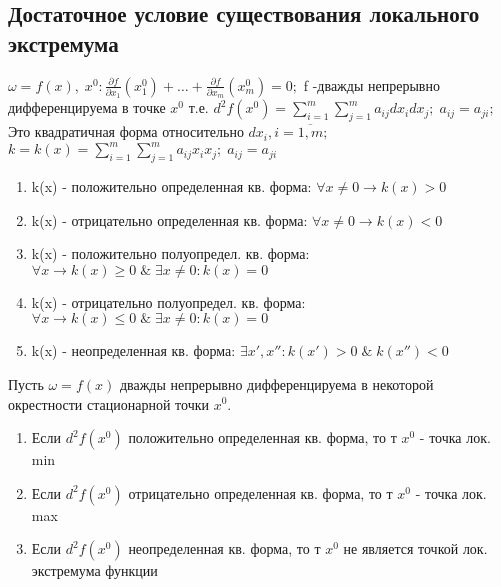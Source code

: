 \documentclass{letnab}
\newcommand{\p}{\partial}
\begin{document}
\subsection{Достаточное условие существования локального экстремума}
$\omega=f(x), \; x^0: \frac{\p f}{\p x_1}(x^0_1) + \dots +  \frac{\p f}{\p x_m}(x^0_m)=0; $ f -дважды непрерывно дифференцируема в точке $x^0$ т.е. $d^2f(x^0)=\sum\limits_{i=1}^{m}\sum\limits_{j=1}^{m}a_{ij}dx_idx_j; \; a_{ij}=a_{ji};$\\
Это квадратичная форма относительно $dx_i, i=\overline{1,m}; \;$ 
$k=k(x)=\sum\limits_{i=1}^{m}\sum\limits_{j=1}^{m}a_{ij}x_ix_j; \; a_{ij}=a_{ji}$
\begin{enumerate}
	\item k(x) - положительно определенная кв. форма: $\forall x\ne 0 \rightarrow k(x)>0$
	\item k(x) - отрицательно определенная кв. форма: $\forall x\ne 0 \rightarrow k(x)<0$
	\item k(x) - положительно полуопредел. кв. форма: $\forall x \rightarrow k(x)\geq0 \;\&\; \exists x\ne 0: k(x)=0$
	\item k(x) - отрицательно полуопредел. кв. форма: $\forall x \rightarrow k(x)\leq0 \;\&\; \exists x\ne 0: k(x)=0$
	\item k(x) - неопределенная кв. форма: $\exists x', x'': k(x')>0 \;\&\; k(x'')<0$
\end{enumerate}
\begin{theorem}
	\label{th:2}
	Пусть $\omega=f(x)$ дважды непрерывно дифференцируема в некоторой окрестности стационарной точки $x^0$. 
	\begin{enumerate}
		\item Если $d^2f(x^0)$ положительно определенная кв. форма, то т $x^0$ - точка лок. min
		\item Если $d^2f(x^0)$ отрицательно определенная кв. форма, то т $x^0$ - точка лок. max
		\item Если $d^2f(x^0)$ неопределенная кв. форма, то т $x^0$ не является точкой лок. экстремума функции
	\end{enumerate}
\end{theorem}
\end{document}
